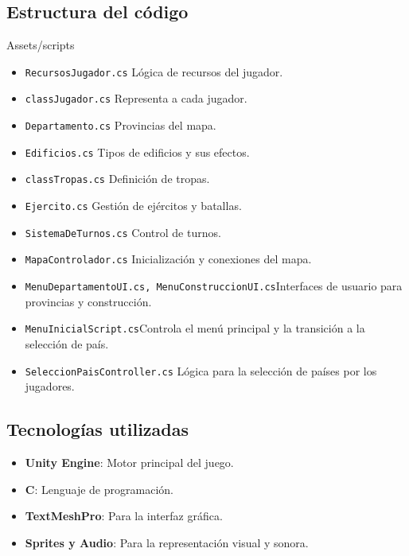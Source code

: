 \documentclass[a4paper,12pt]{article}
\begin{document}
\subsection{Estructura del código}
\begin{description}
    \item[Assets/scripts] 
\end{description}
\begin{itemize}
    \item \colorbox{green!30}{\texttt{RecursosJugador.cs}} Lógica de recursos del jugador.
    \item \colorbox{green!30}{\texttt{classJugador.cs}} Representa a cada jugador.
    \item \colorbox{green!30}{\texttt{Departamento.cs}} Provincias del mapa.
    \item \colorbox{green!30}{\texttt{Edificios.cs}} Tipos de edificios y sus efectos.
    \item \colorbox{green!30}{\texttt{classTropas.cs}} Definición de tropas.
    \item \colorbox{green!30}{\texttt{Ejercito.cs}} Gestión de ejércitos y batallas.
    \item \colorbox{green!30}{\texttt{SistemaDeTurnos.cs}} Control de turnos.
    \item \colorbox{green!30}{\texttt{MapaControlador.cs}} Inicialización y conexiones del mapa.
    \item \colorbox{green!30}{\texttt{MenuDepartamentoUI.cs, MenuConstruccionUI.cs}}Interfaces de usuario para provincias y construcción.
    \item \colorbox{green!30}{\texttt{MenuInicialScript.cs}}Controla el menú principal y la transición a la selección de país.
    \item \colorbox{green!30}{\texttt{SeleccionPaisController.cs}} Lógica para la selección de países por los jugadores.
\end{itemize}

\subsection{Tecnologías utilizadas}
\begin{itemize}
    \item \textbf{Unity Engine}: Motor principal del juego.
    \item \textbf{C}: Lenguaje de programación.
    \item \textbf{TextMeshPro}: Para la interfaz gráfica.
    \item \textbf{Sprites y Audio}: Para la representación visual y sonora.
\end{itemize}
\end{document}
